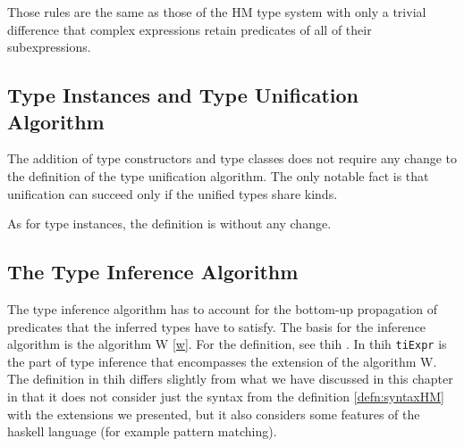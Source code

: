 Those rules are the same as those of the HM type system with only a trivial difference that complex expressions retain predicates of all of their subexpressions.


\subsection{Type Instances and Type Unification Algorithm}

The addition of type constructors and type classes does not require any change to the definition of the type unification algorithm. The only notable fact is that unification can succeed only if the unified types share kinds.

As for type instances, the definition is without any change.

\subsection{The Type Inference Algorithm}

The type inference algorithm has to account for the bottom-up propagation of predicates that the inferred types have to satisfy. The basis for the inference algorithm is the algorithm W \ref{w}. For the definition, see thih \cite{jones1999typing}. In thih \lstinline[language=haskell]{tiExpr} is the part of type inference that encompasses the extension of the algorithm W. The definition in thih differs slightly from what we have discussed in this chapter in that it does not consider just the syntax from the definition \ref{defn:syntaxHM} with the extensions we presented, but it also considers some features of the haskell language (for example pattern matching).


